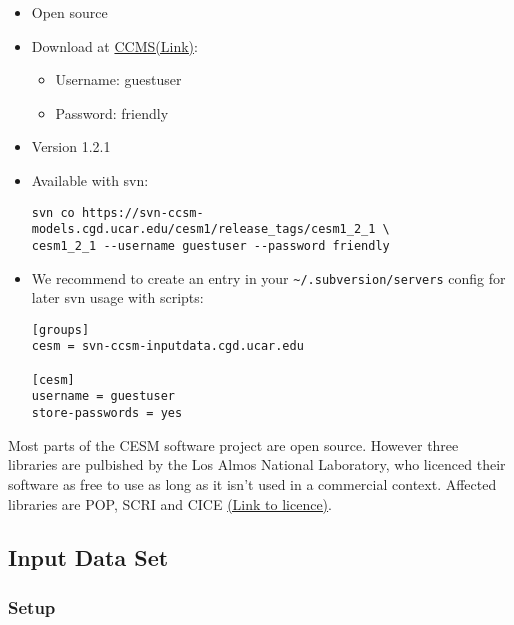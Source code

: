 \documentclass[]{article}
\providecommand{\tightlist}{%
  \setlength{\itemsep}{0pt}\setlength{\parskip}{0pt}}
\begin{document}
\begin{itemize}
\item
  Open source
\item
  Download at
  \href{http://www.cesm.ucar.edu/models/cesm1.2/cesm/doc/usersguide/x290.html\#download_ccsm_code}{CCMS(Link)}:

  \begin{itemize}
  \tightlist
  \item
    Username: guestuser
  \item
    Password: friendly
  \end{itemize}
\item
  Version 1.2.1
\item
  Available with svn:

\begin{verbatim}
svn co https://svn-ccsm-models.cgd.ucar.edu/cesm1/release_tags/cesm1_2_1 \
cesm1_2_1 --username guestuser --password friendly
\end{verbatim}
\item
  We recommend to create an entry in your
  \texttt{\textasciitilde{}/.subversion/servers} config for later svn
  usage with scripts:

\begin{verbatim}
[groups]
cesm = svn-ccsm-inputdata.cgd.ucar.edu

[cesm]
username = guestuser
store-passwords = yes
\end{verbatim}
\end{itemize}

Most parts of the CESM software project are open source. However three
libraries are pulbished by the Los Almos National Laboratory, who
licenced their software as free to use as long as it isn't used in a
commercial context. Affected libraries are POP, SCRI and CICE
\href{http://www.cesm.ucar.edu/management/UofCAcopyright.ccsm3.html}{(Link
to licence)}.

\subsection{Input Data Set}\label{input-data-set}

\subsubsection{Setup}\label{setup}
\end{document}
